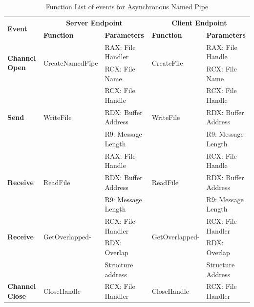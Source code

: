     \begin{table}[H]
        \centering
        \caption{Function List  of events for Asynchronous Named Pipe}
        \label{asynfunctions}
        \begin{tabular}{|l|l|l|l|l|}
            \hline
             \multirow{2}{*}{\textbf{Event}} &
               \multicolumn{2}{c|}{\textbf{Server Endpoint}} &
               \multicolumn{2}{c|}{\textbf{Client Endpoint}} \\
             \cline{2-5}
              & \textbf{Function}& \textbf{Parameters} & \textbf{Function} & \textbf{Parameters}  \\
             \hline
             \multirow{2}{*}{{\textbf{Channel Open}}}
             &\multirow{2}{*}{{CreateNamedPipe}} &  RAX: File Handler & \multirow{2}{*}{CreateFile} &  RAX: File Handle\\
              \cline{3-3} \cline{5-5}
             &&  RCX: File Name &  &  RCX: File Name\\
            \hline
             \multirow{3}{*}{{\textbf{Send}}}
             &\multirow{3}{*}{WriteFile} &  RCX: File Handle & \multirow{3}{*}{WriteFile} &  RCX: File Handle\\
              \cline{3-3} \cline{5-5}
             &&  RDX: Buffer Address &  &  RDX: Buffer Address\\
                           \cline{3-3} \cline{5-5}
             & &  R9: Message Length &  &  R9: Message Length\\
            \hline
            \multirow{3}{*}{{\textbf{Receive}}}
             & \multirow{3}{*}{ReadFile}&  RAX: File Handle & \multirow{3}{*}{ReadFile} &  RCX: File Handle\\
              \cline{3-3} \cline{5-5}
              &&  RDX: Buffer Address &  &  RDX: Buffer Address\\
                           \cline{3-3} \cline{5-5}
             & &  R9: Message Length &  &  R9: Message Length\\
              \hline
               \multirow{2}{*}{{\textbf{Receive}}}
             & \multirow{2}{*}{GetOverlapped-}&  RCX: File Handler & \multirow{2}{*}{GetOverlapped-} &  RCX: File Handler\\
              \cline{3-3} \cline{5-5}
             &  \multirow{2}{*}{Result} &  RDX:  Overlap  &  \multirow{2}{*}{Result }&  RDX:  Overlap \\
              &  &  Structure address &  &  Structure Address\\
            \hline                       
            \textbf{Channel Close}
             &{CloseHandle} &{RCX: File Handler} & {CloseHandle} &  {RCX: File Handler}\\
            \hline
        \end{tabular}
    \end{table}
    
